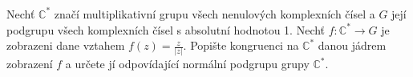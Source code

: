 \subsubsection{}
Nechť $\mathbb{C}^{*}$ značí multiplikativní grupu všech nenulových komplexních čísel
a $G$ její podgrupu všech komplexních čísel s absolutní hodnotou 1. Nechť
$f:\mathbb{C}^{*} \rightarrow G$ je zobrazeni dane vztahem $f(z) =
\frac{z}{|z|}$. Popište kongruenci na $\mathbb{C}^{*}$ danou jádrem zobrazení
$f$ a určete jí odpovídající normální podgrupu grupy $\mathbb{C}^{*}$.
